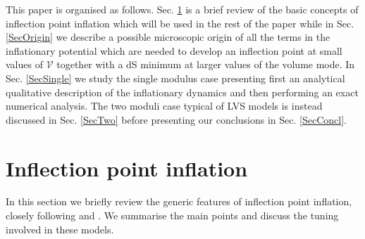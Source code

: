 \documentclass[11pt,a4paper]{article}
\newcommand\vo{{\mathcal{V}}}
\begin{document}
This paper is organised as follows. Sec. \ref{SecIPInf} is a brief review of the basic concepts of inflection point inflation which will be used in the rest of the paper while in Sec. \ref{SecOrigin} we describe a possible microscopic origin of all the terms in the inflationary potential which are needed to develop an inflection point at small values of $\vo$ together with a dS minimum at larger values of the volume mode. In Sec. \ref{SecSingle} we study the single modulus case presenting first an analytical qualitative description of the inflationary dynamics and then performing an exact numerical analysis. The two moduli case typical of LVS models is instead discussed in Sec. \ref{SecTwo} before presenting our conclusions in Sec. \ref{SecConcl}.


\section{Inflection point inflation}
\label{SecIPInf}

In this section we briefly review the generic features of inflection point inflation, closely following  \cite{Baumann:2007ah} and \cite{Linde:2007jn}. We summarise the main points and discuss the tuning involved in these models.
\end{document}
